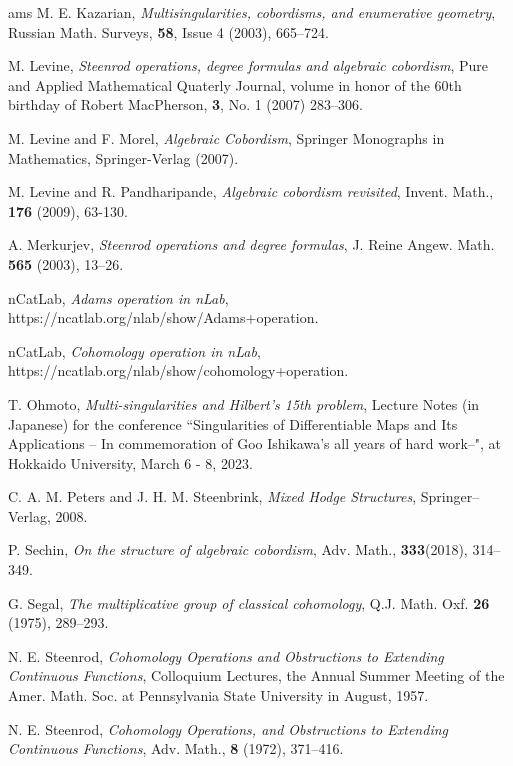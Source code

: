 \documentclass[a4paper]{amsart}
\begin{document}
\begin{thebibliography}{ams}
 M. E. Kazarian, {\it Multisingularities, cobordisms, and enumerative geometry}, Russian Math. Surveys, {\bf 58}, Issue 4 (2003), 665--724.

M. Levine, {\it Steenrod operations, degree formulas and algebraic cobordism}, Pure and Applied Mathematical Quaterly Journal, volume in honor of the 60th birthday of Robert MacPherson, {\bf 3}, No. 1 (2007) 283--306.

M. Levine and F. Morel,
{\it Algebraic Cobordism},
Springer Monographs in Mathematics, Springer-Verlag (2007).

M. Levine and R. Pandharipande,
{\it Algebraic cobordism revisited},
Invent. Math., {\bf 176} (2009), 63-130.

 A. Merkurjev, {\it Steenrod operations and degree formulas},  J. Reine Angew. Math. {\bf 565} (2003), 13--26.

 nCatLab, {\it Adams operation in nLab}, 
https://ncatlab.org/nlab/show/Adams+operation.

 nCatLab, {\it Cohomology operation in nLab}, 
https://ncatlab.org/nlab/show/cohomology+operation.


 T. Ohmoto, {\it Multi-singularities and Hilbert's 15th problem}, Lecture Notes (in Japanese) for the conference ``Singularities of Differentiable Maps and Its Applications -- In commemoration of Goo Ishikawa's all years of hard work--", at Hokkaido University, March 6 - 8, 2023.

 C. A. M. Peters and J. H. M. Steenbrink, {\it Mixed Hodge Structures}, Springer--Verlag, 2008. 

 P. Sechin, {\it On the structure of algebraic cobordism}, Adv. Math., {\bf 333}(2018), 314--349.

 G. Segal, {\it The multiplicative group of classical cohomology}, Q.J. Math. Oxf. {\bf 26} (1975), 289--293.

 N. E. Steenrod, {\it Cohomology Operations and Obstructions to Extending Continuous Functions}, Colloquium Lectures, the Annual Summer Meeting of the Amer. Math. Soc. at Pennsylvania State University in August, 1957.

 N. E. Steenrod, {\it Cohomology Operations, and Obstructions to Extending Continuous Functions}, Adv. Math., {\bf 8} (1972), 371--416.


\end{thebibliography}
\end{document}
